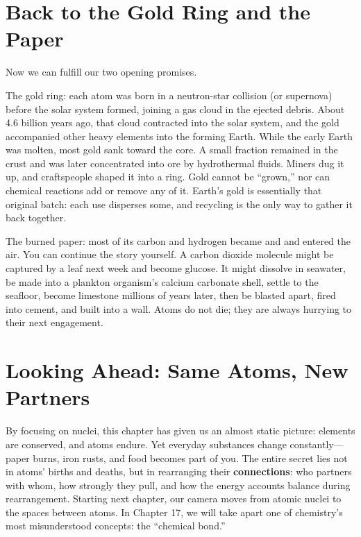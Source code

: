 \section{Back to the Gold Ring and the Paper}

Now we can fulfill our two opening promises.

The gold ring: each atom was born in a neutron-star collision (or supernova) before the solar system formed, joining a gas cloud in the ejected debris. About 4.6 billion years ago, that cloud contracted into the solar system, and the gold accompanied other heavy elements into the forming Earth. While the early Earth was molten, most gold sank toward the core. A small fraction remained in the crust and was later concentrated into ore by hydrothermal fluids. Miners dug it up, and craftspeople shaped it into a ring. Gold cannot be ``grown,'' nor can chemical reactions add or remove any of it. Earth's gold is essentially that original batch: each use disperses some, and recycling is the only way to gather it back together.

The burned paper: most of its carbon and hydrogen became  and  and entered the air. You can continue the story yourself. A carbon dioxide molecule might be captured by a leaf next week and become glucose. It might dissolve in seawater, be made into a plankton organism's calcium carbonate shell, settle to the seafloor, become limestone millions of years later, then be blasted apart, fired into cement, and built into a wall. Atoms do not die; they are always hurrying to their next engagement.

\section{Looking Ahead: Same Atoms, New Partners}

By focusing on nuclei, this chapter has given us an almost static picture: elements are conserved, and atoms endure. Yet everyday substances change constantly---paper burns, iron rusts, and food becomes part of you. The entire secret lies not in atoms' births and deaths, but in rearranging their \textbf{connections}: who partners with whom, how strongly they pull, and how the energy accounts balance during rearrangement. Starting next chapter, our camera moves from atomic nuclei to the spaces between atoms. In Chapter 17, we will take apart one of chemistry's most misunderstood concepts: the ``chemical bond.''

